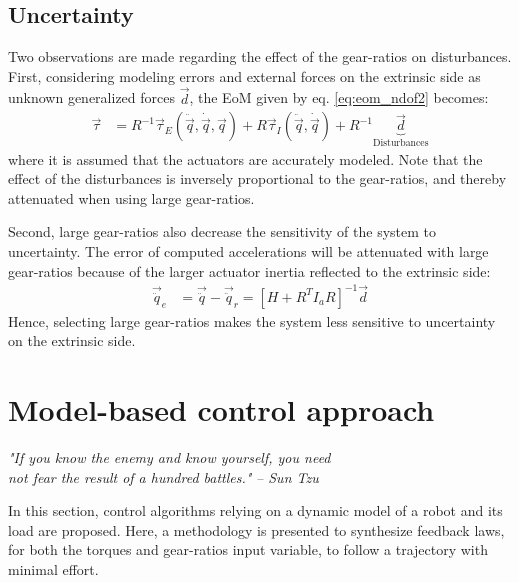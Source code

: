 \subsection{Uncertainty}
\label{sec:uncertainty}

Two observations are made regarding the effect of the gear-ratios on disturbances. First, considering modeling errors and external forces on the extrinsic side as unknown generalized forces $\vec{d}$, the EoM given by eq. \eqref{eq:eom_ndof2} becomes:
\begin{align}
	\vec{\tau} &= R^{-1} 
	\vec{\tau}_{E}(\ddot{\vec{q}},\dot{\vec{q}},\vec{q}) 
	+ R 
	\vec{\tau}_{I}(\ddot{\vec{q}},\dot{\vec{q}})
    + R^{-1}
    \underbrace{ 
	\vec{d}
	}_{\text{Disturbances}}    
 \label{eq:eom_ndof3}
\end{align}
where it is assumed that the actuators are accurately modeled. Note that the effect of the disturbances is inversely proportional to the gear-ratios, and thereby attenuated when using large gear-ratios. 

Second, large gear-ratios also decrease the sensitivity of the system to uncertainty. The error of computed accelerations will be attenuated with large gear-ratios because of the larger  actuator inertia reflected to the extrinsic side:
\begin{align}
	\vec{\ddot{q}}_e &= \vec{\ddot{q}} - \vec{\ddot{q}}_r = 
	\left[ 
    H + R^T I_a R
	\right]^{-1}
    \vec{d}
 \label{eq:sens}
\end{align}
%
Hence, selecting large gear-ratios makes the system less sensitive to uncertainty on the extrinsic side.


\newpage

\section{Model-based control approach}
\label{sec:HierachicalControlApproach}


\begin{flushright}
\textit{"If you know the enemy and know yourself, you need \\ not fear the result of a hundred battles."}  \emph{-- Sun Tzu}
\end{flushright}
\vspace{+10pt}

In this section, control algorithms relying on a dynamic model of a robot and its load are proposed. Here, a methodology is presented to synthesize feedback laws, for both the torques and gear-ratios input variable, to follow a trajectory with minimal effort. 


